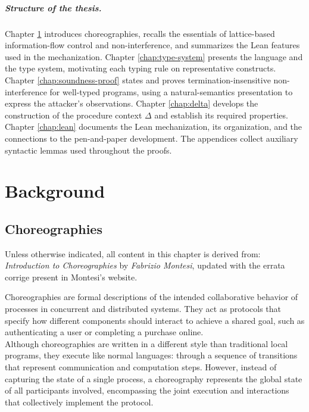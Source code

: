 \documentclass[12pt,a4paper,twoside]{book}
\begin{document}
\paragraph{Structure of the thesis.}
Chapter \ref{chap:background} introduces choreographies, recalls the essentials of lattice-based information-flow control and non-interference, and summarizes the Lean features used in the mechanization.
Chapter \ref{chap:type-system} presents the language and the type system, motivating each typing rule on representative constructs.
Chapter \ref{chap:soundness-proof} states and proves termination-insensitive non-interference for well-typed programs, using a natural-semantics presentation to express the attacker's observations.
Chapter \ref{chap:delta} develops the construction of the procedure context $\Delta$ and establish its required properties.
Chapter \ref{chap:lean} documents the Lean mechanization, its organization, and the connections to the pen-and-paper development.
The appendices collect auxiliary syntactic lemmas used throughout the proofs.

\chapter{Background} \label{chap:background}
\section{Choreographies}
\label{background:choreographies}
Unless otherwise indicated, all content in this chapter is derived from: \textit{Introduction to Choreographies\cite{montesi2023introduction}} by \textit{Fabrizio Montesi}, updated with the errata corrige present in Montesi's website\cite{montesiChoreographies}.
\vspace{10pt}

Choreographies are formal descriptions of the intended collaborative behavior of processes in concurrent and distributed systems. They act as protocols that specify how different components should interact to achieve a shared goal, such as authenticating a user or completing a purchase online.\\
Although choreographies are written in a different style than traditional local programs, they execute like normal languages: through a sequence of transitions that represent communication and computation steps. However, instead of capturing the state of a single process, a choreography represents the global state of all participants involved, encompassing the joint execution and interactions that collectively implement the protocol.
\end{document}
